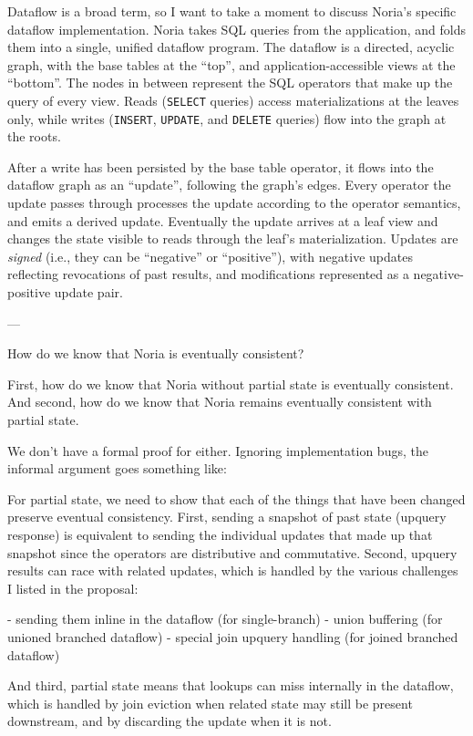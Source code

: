 Dataflow is a broad term, so I want to take a moment to discuss Noria's specific
dataflow implementation. Noria takes SQL queries from the application, and folds
them into a single, unified dataflow program. The dataflow is a directed,
acyclic graph, with the base tables at the ``top'', and application-accessible
views at the ``bottom''. The nodes in between represent the SQL operators that
make up the query of every view. Reads (\texttt{SELECT} queries) access
materializations at the leaves only, while writes (\texttt{INSERT},
\texttt{UPDATE}, and \texttt{DELETE} queries) flow into the graph at the roots.

After a write has been persisted by the base table operator, it flows into the
dataflow graph as an ``update'', following the graph's edges. Every operator the
update passes through processes the update according to the operator semantics,
and emits a derived update. Eventually the update arrives at a leaf view and
changes the state visible to reads through the leaf's materialization. Updates
are \emph{signed} (i.e., they can be ``negative'' or ``positive''), with
negative updates reflecting revocations of past results, and modifications
represented as a negative-positive update pair.

---

How do we know that Noria is eventually consistent?

First, how do we know that Noria without partial state is eventually
consistent. And second, how do we know that Noria remains eventually
consistent with partial state.

We don't have a formal proof for either. Ignoring implementation bugs, the
informal argument goes something like:

For partial state, we need to show that each of the things that have been
changed preserve eventual consistency. First, sending a snapshot of past state
(upquery response) is equivalent to sending the individual updates that made
up that snapshot since the operators are distributive and commutative. Second,
upquery results can race with related updates, which is handled by the various
challenges I listed in the proposal:

 - sending them inline in the dataflow (for single-branch)
 - union buffering (for unioned branched dataflow)
 - special join upquery handling (for joined branched dataflow)

And third, partial state means that lookups can miss internally in the
dataflow, which is handled by join eviction when related state may still be
present downstream, and by discarding the update when it is not.
